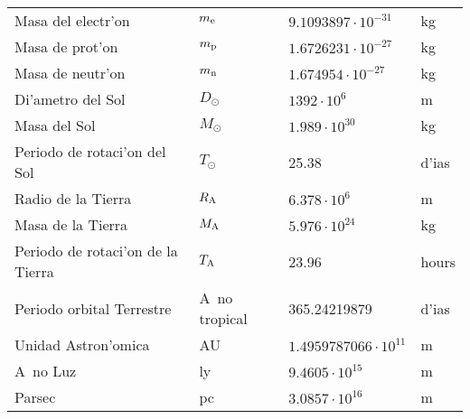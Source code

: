 \begin{center}
\begin{tabular}{||l|lll||}
Masa del electr'on     &$m_{\rm e}$&$9.1093897\cdot10^{-31}$&kg\rule{0pt}{13pt}\\
Masa de prot'on        &$m_{\rm p}$&$1.6726231\cdot10^{-27}$&kg\\
Masa de neutr'on      &$m_{\rm n}$&$1.674954\cdot10^{-27}$&kg\\
\hline
Di'ametro del Sol       &$D_\odot$&$1392\cdot10^6$&m\rule{0pt}{13pt}\\
Masa del Sol             &$M_\odot$&$1.989\cdot10^{30}$&kg\\
Periodo de rotaci'on del Sol &$T_\odot$&25.38&d'ias\\
Radio de la Tierra     &$R_{\rm A}$&$6.378\cdot10^6$&m\\
Masa de la Tierra     &$M_{\rm A}$&$5.976\cdot10^{24}$&kg\\
Periodo de rotaci'on de la Tierra   &$T_{\rm A}$&23.96&hours\\
Periodo orbital Terrestre        &A~no tropical&365.24219879&d'ias\\
Unidad Astron'omica            &AU&$1.4959787066\cdot10^{11}$&m\\
A~no Luz                   &ly&$9.4605\cdot10^{15}$&m\\
Parsec                       &pc&$3.0857\cdot10^{16}$&m\\
\hline
\end{tabular}
\end{center}

